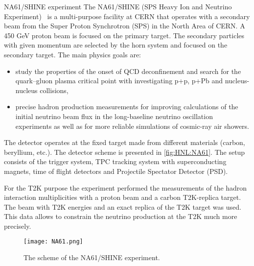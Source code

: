 \documentclass[../main.tex]{subfiles}
\begin{document}
\begin{bclogo}[couleur=blue!2, arrondi=0.1, logo=\bcinfo, nobreak=true]{NA61/SHINE experiment}
The NA61/SHINE (SPS Heavy Ion and Neutrino Experiment)~\cite{Abgrall2014} is a multi-purpose facility at CERN that operates with a secondary beam from the Super Proton Synchrotron (SPS) in the North Area of CERN. A 450 GeV proton beam is focused on the primary target. The secondary particles with given momentum are selected by the horn system and focused on the secondary target. The main physics goals are:
\begin{itemize}
    \item study the properties of the onset of QCD deconfinement and search for the quark--gluon plasma critical point with investigating p+p, p+Pb and nucleus-nucleus collisions,
    \item precise hadron production measurements for improving calculations of the initial neutrino beam flux in the long-baseline neutrino oscillation experiments as well as for more reliable simulations of cosmic-ray air showers.
\end{itemize}

The detector operates at the fixed target made from different materials (carbon, beryllium, etc.). The detector scheme is presented in \autoref{fig:HNL:NA61}. The setup consists of the trigger system, TPC tracking system with superconducting magnets, time of flight detectors and Projectile Spectator Detector (PSD).

For the T2K purpose the experiment performed the measurements of the hadron interaction multiplicities with a proton beam and a carbon T2K-replica target. The beam with T2K energies and an exact replica of the T2K target was used. This data allows to constrain the neutrino production at the T2K much more precisely.
\end{bclogo}

\begin{figure}[!ht]
    \centering
    \texttt{[image: NA61.png]}
    \caption{The scheme of the NA61/SHINE experiment.}
    \label{fig:HNL:NA61}
\end{figure}
\end{document}

